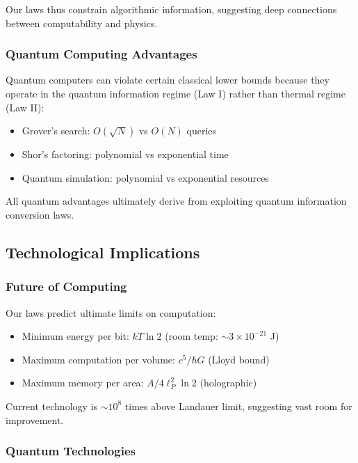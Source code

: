 \documentclass[11pt,a4paper]{article}
\theoremstyle{plain}
\theoremstyle{definition}
\theoremstyle{remark}
\begin{document}
Our laws thus constrain algorithmic information, suggesting deep connections between computability and physics.

\subsubsection{Quantum Computing Advantages}

Quantum computers can violate certain classical lower bounds because they operate in the quantum information regime (Law I) rather than thermal regime (Law II):

\begin{itemize}[leftmargin=*]
\item Grover's search: $O(\sqrt{N})$ vs $O(N)$ queries
\item Shor's factoring: polynomial vs exponential time
\item Quantum simulation: polynomial vs exponential resources
\end{itemize}

All quantum advantages ultimately derive from exploiting quantum information conversion laws.

\subsection{Technological Implications}

\subsubsection{Future of Computing}

Our laws predict ultimate limits on computation:

\begin{itemize}[leftmargin=*]
\item Minimum energy per bit: $kT\ln 2$ (room temp: $\sim 3\times 10^{-21}$ J)
\item Maximum computation per volume: $c^5/\hbar G$ (Lloyd bound)
\item Maximum memory per area: $A/4\ell_P^2\ln 2$ (holographic)
\end{itemize}

Current technology is $\sim 10^{8}$ times above Landauer limit, suggesting vast room for improvement.

\subsubsection{Quantum Technologies}
\end{document}

